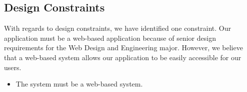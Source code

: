 \subsection{Design Constraints}
With regards to design constraints, we have identified one constraint. Our application must be a web-based application because of senior design requirements for the Web Design and Engineering major. However, we believe that a web-based system allows our application to be easily accessible for our users. 
\begin{itemize}
\item The system must be a web-based system.
\end{itemize}
